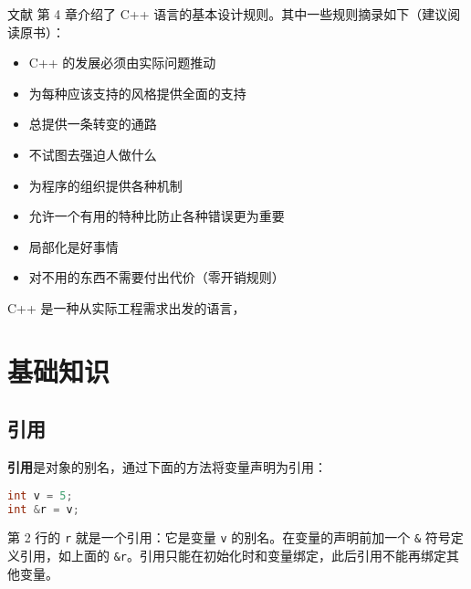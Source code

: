 \documentclass[hyperref,UTF8]{article}
\begin{document}
文献 \cite{BjarneStroustrup2002C} 第 4 章介绍了 C++ 语言的基本设计规则。其中一些规则摘录如下（建议阅读原书）：

\begin{itemize}
  \item C++ 的发展必须由实际问题推动
  \item 为每种应该支持的风格提供全面的支持
  \item 总提供一条转变的通路
  \item 不试图去强迫人做什么
  \item 为程序的组织提供各种机制
  \item 允许一个有用的特种比防止各种错误更为重要
  \item 局部化是好事情
  \item 对不用的东西不需要付出代价（零开销规则）
\end{itemize}

C++ 是一种从实际工程需求出发的语言，

\section{基础知识}

\subsection{引用}

\textbf{引用}是对象的别名，通过下面的方法将变量声明为引用：
\begin{lstlisting}[language=c++]
int v = 5;
int &r = v;
\end{lstlisting}
第 2 行的 \texttt{r} 就是一个引用：它是变量 \texttt{v} 的别名。在变量的声明前加一个 \texttt{\&} 符号定义引用，如上面的 \texttt{\&r}。引用只能在初始化时和变量绑定，此后引用不能再绑定其他变量。
\end{document}
